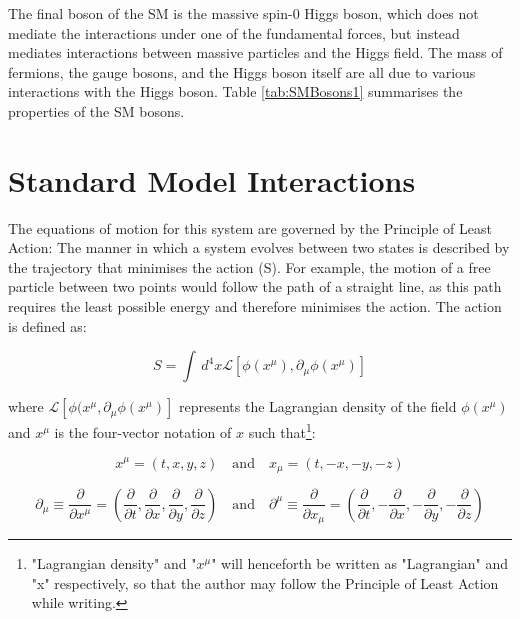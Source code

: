 \documentclass[12pt,a4paper,epsf,portrait,times,epsfig]{report}
\begin{document}
	The final boson of the SM is the massive spin-0 Higgs boson, which does not mediate the interactions under one of the fundamental forces, but instead mediates interactions between massive particles and the Higgs field. The mass of fermions, the gauge bosons, and the Higgs boson itself are all due to various interactions with the Higgs boson. Table \ref{tab:SMBosons1} summarises the properties of the SM bosons. 
	

	\section{Standard Model Interactions}

	The equations of motion for this system are governed by the Principle of Least Action: The manner in which a system evolves between two states is described by the trajectory that minimises the action (S). For example, the motion of a free particle between two points would follow the path of a straight line, as this path requires the least possible energy and therefore minimises the action. The action is defined as:
	
	\begin{equation}
		S = \int \,d^{4}x \mathcal{L}[\phi(x^{\mu}),\partial_{\mu}\phi(x^{\mu})]
	\end{equation}

	where $\mathcal{L}[\phi(x^{\mu},\partial_{\mu}\phi(x^{\mu})]$ represents the Lagrangian density of the field $\phi(x^{\mu})$ and $x^{\mu}$ is the four-vector notation of $x$ such that\footnote{"Lagrangian density" and "$x^{\mu}$" will henceforth be written as "Lagrangian" and "x" respectively, so that the author may follow the Principle of Least Action while writing.}:
	
	\begin{equation}
		x^{\mu} = (t, x, y, z)
		\quad\mathrm{and}\quad
		x_{\mu} = (t, -x, -y, -z)
	\end{equation} 

	\begin{equation}
		\partial_{\mu} \equiv \frac{\partial}{\partial x^{\mu}}=(\frac{\partial}{\partial t}, \frac{\partial}{\partial x}, \frac{\partial}{\partial y}, \frac{\partial}{\partial z})
		\quad\mathrm{and}\quad
		\partial^{\mu} \equiv \frac{\partial}{\partial x_{\mu}}=(\frac{\partial}{\partial t}, -\frac{\partial}{\partial x}, -\frac{\partial}{\partial y}, -\frac{\partial}{\partial z})
	\end{equation}
\end{document}
